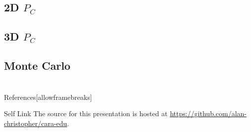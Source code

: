 \documentclass[pdf]{beamer}
\makeatletter
\def\beamer@writeslidentry@miniframesoff{%
  \expandafter\beamer@ifempty\expandafter{\beamer@framestartpage}{}%
  {%
    \clearpage\beamer@notesactions%
  }
}
\newcommand*{\miniframesoff}{\let\beamer@writeslidentry=\beamer@writeslidentry@miniframesoff}
\makeatother
\begin{document}
\subsection{2D $P_C$}

\subsection{3D $P_C$}

\subsection{Monte Carlo}

\miniframesoff
\section*{}
\begin{frame}{References}[allowframebreaks]
  \tiny
\end{frame}

\begin{frame}{Self Link}
  The source for this presentation is hosted at
\url{https://github.com/alan-christopher/cara-edu}.

\end{frame}
\end{document}
